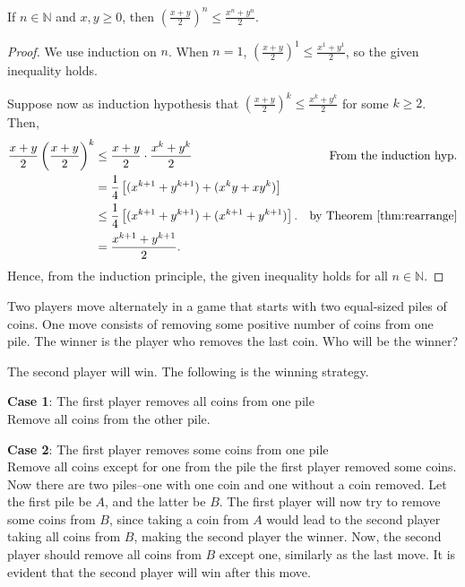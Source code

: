 \documentclass[../main.tex]{subfiles}
\begin{document}
\begin{exercise}
    If $n \in \mathbb N$ and $x, y \geq 0$, then $\left(\frac{x + y}{2}\right)^n \leq \frac{x^n + y^n}{2}$.
\end{exercise}
\begin{proof}
    We use induction on $n$.
    When $n = 1$, $\left( \frac{x+y}{2}\right)^1 \leq \frac{x^1 + y^1}{2}$, so the given inequality holds.

    Suppose now as induction hypothesis that $\left( \frac{x + y}{2}\right)^k \leq \frac{x^k + y^k}{2}$ for some $k \geq 2$.
    Then,
    \begin{align*}
        \frac{x + y}{2} \left( \frac{x + y}{2}\right)^k &\leq \frac{x + y}{2} \cdot \frac{x^k + y^k}{2} &\text{From the induction hyp.}\\
                                                        &= \frac 14 \left[(x^{k+1} + y^{k+1}) + (x^k y + xy^k)\right]\\
                                                        &\leq \frac 14 \left[(x^{k+1} + y^{k+1}) + (x^{k+1} + y^{k+1})\right]. &\text{by Theorem~\ref{thm:rearrange}}\\
                                                        &= \frac{x^{k+1} + y^{k+1}}{2}.
    \end{align*}
    Hence, from the induction principle, the given inequality holds for all $n \in \mathbb N$.
\end{proof}

\begin{exercise}
    Two players move alternately in a game that starts with two equal-sized piles of coins.
    One move consists of removing some positive number of coins from one pile.
    The winner is the player who removes the last coin.
    Who will be the winner?
\end{exercise}
\begin{sol}
    The second player will win.
    The following is the winning strategy.

    \noindent\textbf{Case 1}: The first player removes all coins from one pile\\
    \indent Remove all coins from the other pile.

    \noindent\textbf{Case 2}: The first player removes some coins from one pile\\
    \indent Remove all coins except for one from the pile the first player removed some coins.
    Now there are two piles--one with one coin and one without a coin removed.
    Let the first pile be $A$, and the latter be $B$.
    The first player will now try to remove some coins from $B$, since taking a coin from $A$ would lead to the second player taking all coins from $B$, making the second player the winner.
    Now, the second player should remove all coins from $B$ except one, similarly as the last move.
    It is evident that the second player will win after this move.
\end{sol}
\end{document}

